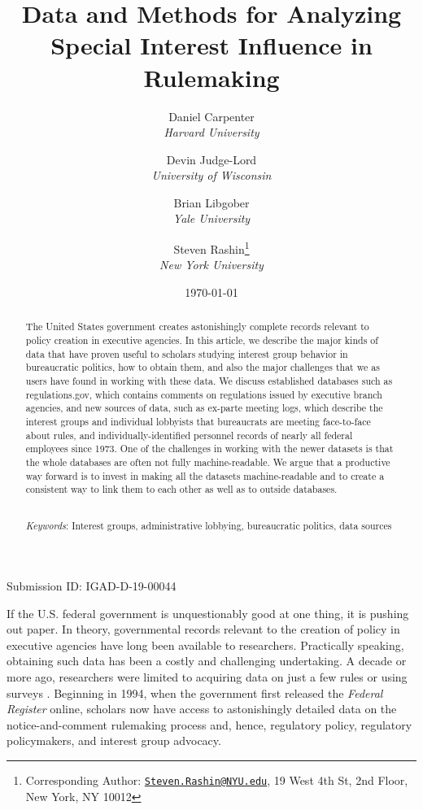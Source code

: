 \documentclass[
      12pt,
        ]{article}
\title{Data and Methods for Analyzing Special Interest Influence in Rulemaking}
\author{ %
            Daniel Carpenter  \\ \emph{Harvard University} 
             \and 
            Devin Judge-Lord  \\ \emph{University of Wisconsin} 
             \and 
            Brian Libgober  \\ \emph{Yale University} 
             \and 
            Steven Rashin\footnote{Corresponding Author:
\href{mailto:Steven.Rashin@NYU.edu}{\nolinkurl{Steven.Rashin@NYU.edu}},
19 West 4th St, 2nd Floor, New York, NY 10012}  \\ \emph{New York University} 
            }
\date{\today}
\begin{document}
 


  \maketitle




  \begin{abstract}
    \noindent The United States government creates astonishingly complete records
relevant to policy creation in executive agencies. In this article, we
describe the major kinds of data that have proven useful to scholars
studying interest group behavior in bureaucratic politics, how to obtain
them, and also the major challenges that we as users have found in
working with these data. We discuss established databases such as
regulations.gov, which contains comments on regulations issued by
executive branch agencies, and new sources of data, such as ex-parte
meeting logs, which describe the interest groups and individual
lobbyists that bureaucrats are meeting face-to-face about rules, and
individually-identified personnel records of nearly all federal
employees since 1973. One of the challenges in working with the newer
datasets is that the whole databases are often not fully
machine-readable. We argue that a productive way forward is to invest in
making all the datasets machine-readable and to create a consistent way
to link them to each other as well as to outside databases. 

          \hfill \\ 
      \noindent \emph{Keywords}: Interest groups, administrative lobbying, bureaucratic politics, data
sources 
    
  \end{abstract}









  \newpage

\noindent 
      \doublespacing 
    \noindent Submission ID: IGAD-D-19-00044

If the U.S. federal government is unquestionably good at one thing, it
is pushing out paper. In theory, governmental records relevant to the
creation of policy in executive agencies have long been available to
researchers. Practically speaking, obtaining such data has been a costly
and challenging undertaking. A decade or more ago, researchers were
limited to acquiring data on just a few rules
\citep[e.g.,][]{GoldenJPART1998} or using surveys
\citep[e.g.,][]{FurlongJPART2004}. Beginning in 1994, when the
government first released the \emph{Federal Register} online, scholars
now have access to astonishingly detailed data on the notice-and-comment
rulemaking process and, hence, regulatory policy, regulatory
policymakers, and interest group advocacy.
\end{document}
